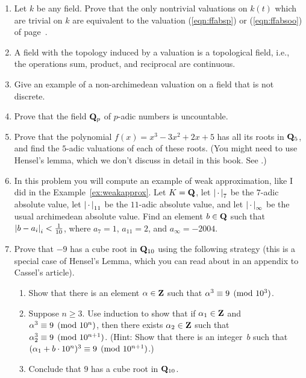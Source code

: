 \begin{enumerate}
\item Let $k$ be any field. Prove that the only nontrivial valuations
on $k(t)$ which are trivial on $k$ are equivalent to the valuation
(\ref{eqn:ffabsp}) or (\ref{eqn:ffabsoo}) of page~\pageref{eqn:ffabsp}.
\item A field with the topology induced by a valuation is
a topological field, i.e., the operations sum, product, 
and reciprocal are continuous.
\item Give an example of a non-archimedean valuation on a field that
is not discrete.
\item Prove that the field $\mathbf{Q}_p$ of $p$-adic numbers is 
uncountable.
\item Prove that the polynomial $f(x)=x^3 - 3x^2 + 2x + 5$ 
has all its roots in $\mathbf{Q}_5$, and find the $5$-adic valuations
of each of these roots.  (You might need to use
Hensel's lemma, which we don't discuss in detail
in this book. See \cite[App.~C]{cassels:global}.)

\item In this problem you will compute an example of weak
  approximation, like I did in the Example~\ref{ex:weakapprox}.  Let
  $K=\mathbf{Q}$, let $\left|\,\cdot\,\right|_7$ be the $7$-adic absolute value, let
  $\left|\,\cdot\,\right|_{11}$ be the $11$-adic absolute value, and let
  $\left|\,\cdot\,\right|_{\infty}$ be the usual archimedean absolute value.  Find an
  element $b\in \mathbf{Q}$ such that $\left|b-a_i\right|_i<\frac{1}{10}$, where $a_7
  = 1$, $a_{11} = 2$, and $a_{\infty} = -2004$.
  
\item Prove that $-9$ has a cube root in $\mathbf{Q}_{10}$ using the following
  strategy (this is a special case of Hensel's Lemma, which you can
  read about in an appendix to Cassel's article).

\begin{enumerate}
\item Show that there is an element $\alpha\in\mathbf{Z}$ such that $\alpha^3\equiv 9\pmod{10^3}$. 
\item Suppose $n\geq 3$. 
Use induction to show that if $\alpha_1\in\mathbf{Z}$ and 
$\alpha^3\equiv 9\pmod{10^n}$,  then there exists $\alpha_2\in\mathbf{Z}$ such 
that $\alpha_2^3\equiv 9\pmod{10^{n+1}}$.
(Hint: Show that there is an integer~$b$ such that
$(\alpha_1 + b\cdot 10^{n})^3 \equiv 9\pmod{10^{n+1}}$.)
\item Conclude that $9$ has a cube root in $\mathbf{Q}_{10}$.
\end{enumerate}


\end{enumerate}
